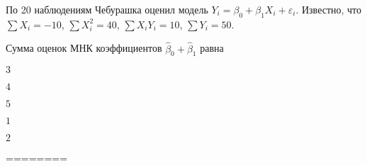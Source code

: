 
\begin{question}
По 20 наблюдениям Чебурашка оценил модель
\(Y_i = \beta_0 + \beta_1 X_i + \varepsilon_i\). Известно, что
\(\sum X_i = -10\), \(\sum X_i^2 = 40\), \(\sum X_i Y_i = 10\),
\(\sum Y_i = 50\).

Сумма оценок МНК коэффициентов \(\hat \beta_0 + \hat \beta_1\) равна
\begin{answerlist}
  \item \(3\)
  \item \(4\)
  \item \(5\)
  \item \(1\)
  \item \(2\)
\end{answerlist}
\end{question}

\begin{solution}
========
\end{solution}

